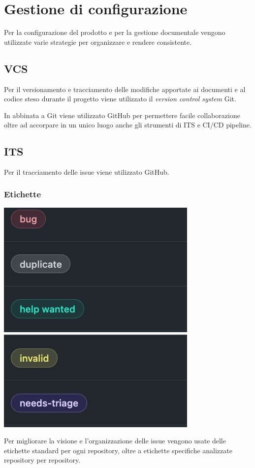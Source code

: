 \section{Gestione di configurazione}\label{s:configurazione}

Per la configurazione del prodotto e per la gestione documentale vengono utilizzate varie strategie per organizzare e rendere consistente.

\subsection{VCS}\label{sss:vcs} Per il versionamento e tracciamento delle modifiche apportate ai documenti e al codice steso durante il progetto viene utilizzato il \textit{version control system} Git. 

In abbinata a Git viene utilizzato GitHub per permettere facile collaborazione oltre ad accorpare in un unico luogo anche gli strumenti di ITS e CI/CD pipeline.

\subsection{ITS} Per il tracciamento delle issue viene utilizzato GitHub.

\subsubsection{Etichette} 

    \includegraphics[width=0.49\linewidth]{img/etichette.jpeg}
    \includegraphics[width=0.49\linewidth]{img/etichette2.jpeg}

Per migliorare la visione e l'organizzazione delle issue vengono usate delle etichette standard per ogni repository, oltre a etichette specifiche analizzate repository per repository.

